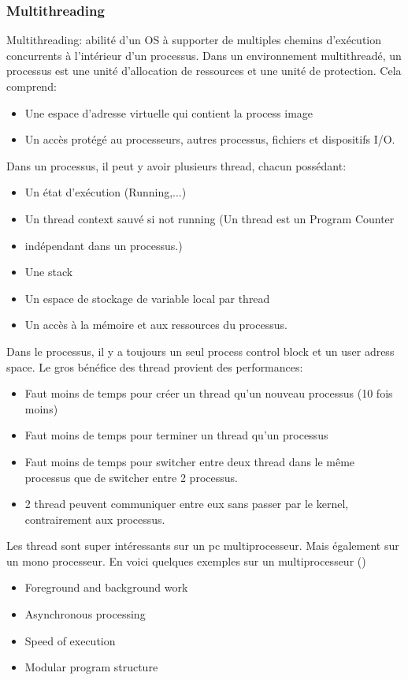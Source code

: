 \subsubsection{Multithreading}
Multithreading: abilité d'un OS à supporter de multiples chemins d'exécution concurrents à l'intérieur d'un processus.
Dans un environnement multithreadé, un processus est une unité d'allocation de ressources et une unité de protection.
Cela comprend:
\begin{itemize}
  \item Une espace d'adresse virtuelle qui contient la process image
  \item Un accès protégé au processeurs, autres processus, fichiers et dispositifs I/O.
\end{itemize}
Dans un processus, il peut y avoir plusieurs thread, chacun possédant:
\begin{itemize}
  \item Un état d'exécution (Running,...)
  \item Un thread context sauvé si not running (Un thread est un Program Counter
  \item indépendant dans un processus.)
  \item Une stack
  \item Un espace de stockage de variable local par thread
  \item Un accès à la mémoire et aux ressources du processus.
\end{itemize}
Dans le processus, il y a toujours un seul process control block et un user adress space.
Le gros bénéfice des thread provient des performances:
\begin{itemize}
  \item Faut moins de temps pour créer un thread qu'un nouveau processus (10 fois moins)
  \item Faut moins de temps pour terminer un thread qu'un processus
  \item Faut moins de temps pour switcher entre deux thread dans le même processus que de switcher entre 2 processus.
  \item 2 thread peuvent communiquer entre eux sans passer par le kernel, contrairement aux processus.
\end{itemize}
Les thread sont super intéressants sur un pc multiprocesseur.
Mais également sur un mono processeur.
En voici quelques exemples sur un multiprocesseur (\cite[p.~181]{stallings})
\begin{itemize}
  \item Foreground and background work
  \item Asynchronous processing
  \item Speed of execution
  \item Modular program structure
\end{itemize}

